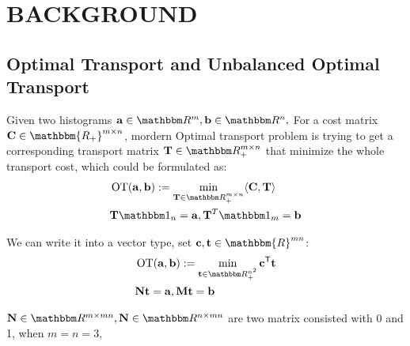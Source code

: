 \section{BACKGROUND}
\subsection{Optimal Transport and Unbalanced Optimal Transport}
Given two histograms $\vec{a}\in \R^{m}, \vec{b} \in \R^{n},$ For a cost matrix $\mat{C} \in \mathbbm{R_{+}}^{m \times n}$, mordern Optimal transport problem is trying to get a corresponding transport matrix $\mat{T} \in \R_{+}^{m \times n}$ that minimize the whole transport cost, which could be formulated as:
\begin{equation}
\begin{split}
&\operatorname{OT}(\vec{a},\vec{b}) := \min_{ \mat{T} \in \R_{+}^{m \times n}} \langle \mat{C}, \mat{T} \rangle \\
& \mat{T} \one_n= \vec{a}, \mat{T}^{T}\one_m = \vec{b}
\end{split}
\end{equation}

We can write it into a vector type, set $\vec{c},\vec{t} \in \mathbbm{R}^{mn}$:
\begin{equation}
\begin{split}
&\operatorname{OT}(\vec{a},\vec{b}) := \min_{\vec{t} \in \R_{+}^{n^2}} \vec{c}^{\tranT}\vec{t} \\
& \mat{N}\vec{t} = \vec{a}, \mat{M}\vec{t} = \vec{b}
\end{split}
\end{equation}

$\mat{N} \in \R^{m \times mn}, \mat{N} \in \R^{n \times mn}$ are two matrix consisted with 0 and 1, when $m=n=3$, 

